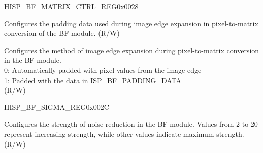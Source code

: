 \begin{register}{H}{ISP\_BF\_MATRIX\_CTRL\_REG}{0x0028}
\begin{regdesc}
\begin{reglist}
\label{fielddesc:ISPBFPADDINGDATA}\item [ISP\_BF\_PADDING\_DATA] Configures the padding data used during image edge expansion in pixel-to-matrix conversion of the BF module. (R/W)
\label{fielddesc:ISPBFPADDINGMODE}\item [ISP\_BF\_PADDING\_MODE] Configures the method of image edge expansion during pixel-to-matrix conversion in the BF module.\\0: Automatically padded with pixel values from the image edge\\1: Padded with the data in \hyperref[fielddesc:ISPBFPADDINGDATA]{ISP\_BF\_PADDING\_DATA}\\(R/W)
\end{reglist}\end{regdesc}
\end{register}


\begin{register}{H}{ISP\_BF\_SIGMA\_REG}{0x002C}\label{regdesc:ISPBFSIGMAREG}
%
%
\regnewline%
\begin{regdesc}\begin{reglist}
\label{fielddesc:ISPSIGMA}\item [ISP\_SIGMA] Configures the strength of noise reduction in the BF module. Values from 2 to 20 represent increasing strength, while other values indicate maximum strength. (R/W)
\end{reglist}\end{regdesc}
\end{register}


